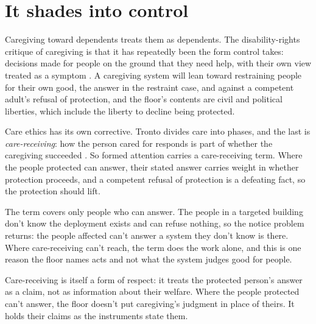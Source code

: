 \section{It shades into control}
\label{sec:23.6}
Caregiving toward dependents treats them as dependents. The disability-rights critique of caregiving is that it has repeatedly been the form control takes: decisions made for people on the ground that they need help, with their own view treated as a symptom \autocite{shakespeare2000help}. A caregiving system will lean toward restraining people for their own good, the answer in the restraint case, and against a competent adult's refusal of protection, and the floor's contents are civil and political liberties, which include the liberty to decline being protected.

Care ethics has its own corrective. Tronto divides care into phases, and the last is \emph{care-receiving}: how the person cared for responds is part of whether the caregiving succeeded \autocite{tronto1993moral}. So formed attention carries a care-receiving term. Where the people protected can answer, their stated answer carries weight in whether protection proceeds, and a competent refusal of protection is a defeating fact, so the protection should lift.

The term covers only people who can answer. The people in a targeted building don't know the deployment exists and can refuse nothing, so the notice problem returns: the people affected can't answer a system they don't know is there. Where care-receiving can't reach, the term does the work alone, and this is one reason the floor names acts and not what the system judges good for people.

Care-receiving is itself a form of respect: it treats the protected person's answer as a claim, not as information about their welfare. Where the people protected can't answer, the floor doesn't put caregiving's judgment in place of theirs. It holds their claims as the instruments state them.
